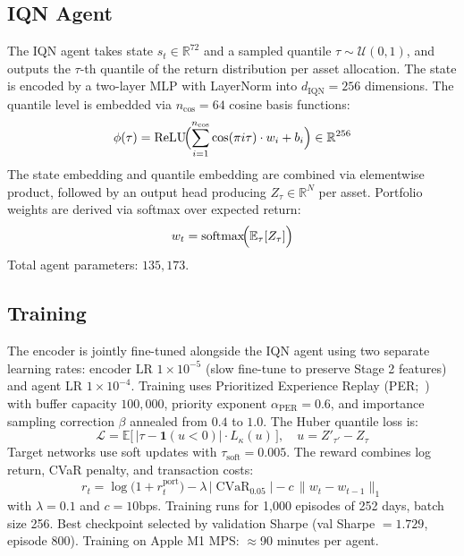 \documentclass[sigconf,nonacm]{acmart}
\newcommand{\R}{\mathbb{R}}
\newcommand{\E}{\mathbb{E}}
\newcommand{\st}{s_t}
\newcommand{\wt}{w_t}
\newcommand{\CVaR}{\operatorname{CVaR}}
\begin{document}
\subsection{IQN Agent}
\label{sec:iqn}
The IQN agent takes state $\st \in \R^{72}$ and a sampled quantile
$\tau \sim \mathcal{U}(0,1)$, and outputs the $\tau$-th quantile of
the return distribution per asset allocation.
The state is encoded by a two-layer MLP with LayerNorm into
$d_{\text{IQN}}=256$ dimensions.
The quantile level is embedded via $n_{\cos}=64$ cosine basis functions:
\begin{equation}
  \phi(\tau) = \text{ReLU}\!\Bigl(
    \sum_{i=1}^{n_{\cos}} \cos(\pi i \tau)\cdot w_i + b_i
  \Bigr) \in \R^{256}
  \label{eq:quantile_emb}
\end{equation}
The state embedding and quantile embedding are combined via elementwise
product, followed by an output head producing
$Z_\tau \in \R^N$ per asset.
Portfolio weights are derived via softmax over expected return:
\begin{equation}
  \wt = \text{softmax}\!\Bigl(\E_\tau[Z_\tau]\Bigr)
  \label{eq:weights}
\end{equation}
Total agent parameters: $135{,}173$.

\subsection{Training}
\label{sec:training}
The encoder is jointly fine-tuned alongside the IQN agent using two
separate learning rates: encoder LR $1\times10^{-5}$ (slow fine-tune to
preserve Stage 2 features) and agent LR $1\times10^{-4}$.
Training uses Prioritized Experience Replay (PER;~\citet{schaul2016}) with
buffer capacity $100{,}000$, priority exponent $\alpha_{\text{PER}}=0.6$,
and importance sampling correction $\beta$ annealed from $0.4$ to $1.0$.
The Huber quantile loss is:
\begin{equation}
  \mathcal{L} = \E\bigl[\,|\tau - \mathbf{1}(u<0)|\cdot L_\kappa(u)\,\bigr],
  \quad u = Z'_{\tau'} - Z_\tau
  \label{eq:huber}
\end{equation}
Target networks use soft updates with $\tau_{\text{soft}}=0.005$.
The reward combines log return, CVaR penalty, and transaction costs:
\begin{equation}
  r_t = \log\!\bigl(1 + r_t^{\text{port}}\bigr)
        - \lambda\,|\CVaR_{0.05}|
        - c\,\|w_t - w_{t-1}\|_1
  \label{eq:reward}
\end{equation}
with $\lambda=0.1$ and $c=10$bps.
Training runs for 1,000 episodes of 252 days, batch size 256.
Best checkpoint selected by validation Sharpe (val Sharpe $= 1.729$,
episode 800).
Training on Apple M1 MPS: $\approx$90 minutes per agent.
\end{document}
